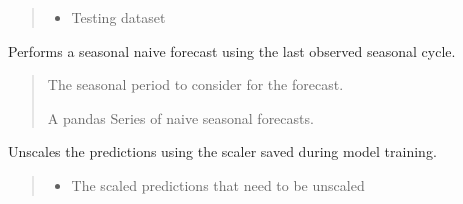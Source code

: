 \documentclass[letterpaper,10pt,english]{sphinxmanual}
\begin{document}
\begin{fulllineitems}
\begin{fulllineitems}
\begin{quote}
\begin{description}
\begin{itemize}
\item {} 
\sphinxAtStartPar
{} \textendash{} Testing dataset

\end{itemize}

\end{description}\end{quote}

\end{fulllineitems}


\begin{fulllineitems}
\label{\detokenize{docs/NAIVE_model:NAIVE_model.NAIVE_Predictor.seasonal_forecast}}
\pysigstartsignatures
{}
\pysigstopsignatures
\sphinxAtStartPar
Performs a seasonal naive forecast using the last observed seasonal cycle.
\begin{quote}\begin{description}
\sphinxAtStartPar
{} \textendash{} The seasonal period to consider for the forecast.

\sphinxAtStartPar
A pandas Series of naive seasonal forecasts.

\end{description}\end{quote}

\end{fulllineitems}


\begin{fulllineitems}
\label{\detokenize{docs/NAIVE_model:NAIVE_model.NAIVE_Predictor.unscale_predictions}}
\pysigstartsignatures
{}
\pysigstopsignatures
\sphinxAtStartPar
Unscales the predictions using the scaler saved during model training.
\begin{quote}\begin{description}
\begin{itemize}
\item {} 
\sphinxAtStartPar
{} \textendash{} The scaled predictions that need to be unscaled


\end{itemize}
\end{description}
\end{quote}
\end{fulllineitems}
\end{fulllineitems}
\end{document}
